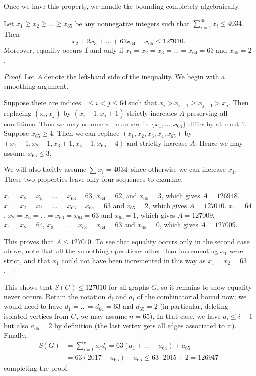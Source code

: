\documentclass[11pt]{scrartcl}
\begin{document}
Once we have this property, we handle the bounding completely algebraically.
\begin{lemma*}
  Let $x_1 \ge x_2 \ge \dots \ge x_{65}$ be any nonnegative integers
  such that $\sum_{i=1}^{65} x_i \le 4034$.
  Then \[ x_2 + 2x_3 + \dots + 63x_{64} + x_{65} \le 127010. \]
  Moreover, equality occurs if and only if
  $x_1 = x_2 = x_3 = \dots = x_{64} = 63$ and $x_{65} = 2$.
\end{lemma*}
\begin{proof}
  Let $A$ denote the left-hand side of the inequality.
  We begin with a smoothing argument.
  \begin{itemize}
    \ii Suppose there are indices $1 \le i < j \le 64$
    such that $x_i > x_{i+1} \ge x_{j-1} > x_j$.
    Then replacing $(x_i, x_j)$ by $(x_i-1, x_j+1)$
    strictly increases $A$ preserving all conditions.
    Thus we may assume all numbers in $\{x_1, \dots, x_{64}\}$
    differ by at most $1$.
    \ii Suppose $x_{65} \ge 4$.
    Then we can replace $(x_1, x_2, x_3, x_4, x_{65})$
    by $(x_1+1, x_2+1, x_3+1, x_4+1, x_{65}-4)$
    and strictly increase $A$.
    Hence we may assume $x_{65} \le 3$.
  \end{itemize}
  We will also tacitly assume $\sum x_i = 4034$,
  since otherwise we can increase $x_1$.
  These two properties leave only four sequences to examine:
  \begin{itemize}
    \ii $x_1 = x_2 = x_3 = \dots = x_{63} = 63$, $x_{64} = 62$,
    and $x_{65} = 3$, which gives $A = 126948$.
    \ii $x_1 = x_2 = x_3 = \dots = x_{63} = x_{64} = 63$ and $x_{65} = 2$,
    which gives $A = 127010$.
    \ii $x_1 = 64$, $x_2 = x_3 = \dots = x_{63} = x_{64} = 63$ and $x_{65} = 1$,
    which gives $A = 127009$.
    \ii $x_1 = x_2 = 64$, $x_3 = \dots = x_{63} = x_{64} = 63$ and $x_{65} = 0$,
    which gives $A = 127009$.
  \end{itemize}
  This proves that $A \le 127010$.
  To see that equality occurs only in the second case above,
  note that all the smoothing operations other than incrementing $x_1$ were strict,
  and that $x_1$ could not have been incremented in this way
  as $x_1 = x_2 = 63$.
\end{proof}

This shows that $S(G) \le 127010$ for all graphs $G$,
so it remains to show equality never occurs.
Retain the notation $d_i$ and $a_i$ of the combinatorial bound now;
we would need to have $d_1 = \dots = d_{64} = 63$ and $d_{65} = 2$
(in particular, deleting isolated vertices from $G$, we may assume $n=65$).
In that case, we have $a_i \le i-1$ but also $a_{65} = 2$ by definition
(the last vertex gets all edges associated to it).
Finally,
\begin{align*}
  S(G) &= \sum_{i=1}^n a_i d_i = 63(a_1 + \dots + a_{64}) + a_{65} \\
  &= 63(2017-a_{65}) + a_{65} \le 63 \cdot 2015 + 2 = 126947
\end{align*}
completing the proof.
\end{document}
